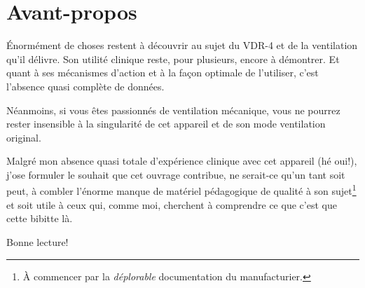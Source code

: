 \chapter{Avant-propos}
Énormément de choses restent à découvrir au sujet du VDR-4 et de la ventilation
qu'il délivre. Son utilité clinique reste, pour plusieurs, encore à démontrer.
Et quant à ses mécanismes d'action et à la façon optimale de l'utiliser, c'est
l'absence quasi complète de données.

Néanmoins, si vous êtes passionnés de ventilation mécanique, vous ne pourrez
rester insensible à la singularité de cet appareil et de son mode ventilation
original.

Malgré mon absence quasi totale d'expérience clinique avec cet appareil (hé
oui!), j'ose formuler le souhait que cet ouvrage contribue, ne serait-ce qu'un
tant soit peut, à combler l'énorme manque de matériel pédagogique de qualité à
son sujet\footnote{À commencer par la {\em déplorable} documentation du
manufacturier.} et soit utile à ceux qui, comme moi, cherchent à comprendre ce
que c'est que cette bibitte là.

Bonne lecture!

\cleardoublepage
\tableofcontents
\listoftables
\listoffigures
\listofexercices
